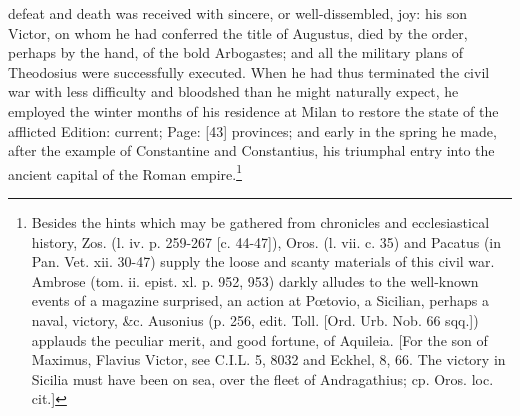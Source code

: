 defeat and death was received with sincere, or well-dissembled, joy: his son Victor, on whom he had conferred the title of Augustus, died by the order, perhaps by the hand, of the bold Arbogastes; and all the military plans of Theodosius were successfully executed. When he had thus terminated the civil war with less difficulty and bloodshed than he might naturally expect, he employed the winter months of his residence at Milan to restore the state of the afflicted Edition: current; Page: [43] provinces; and early in the spring he made, after the example of Constantine and Constantius, his triumphal entry into the ancient capital of the Roman empire.\footnote{Besides the hints which may be gathered from chronicles and ecclesiastical history, Zos. (l. iv. p. 259-267 [c. 44-47]), Oros. (l. vii. c. 35) and Pacatus (in Pan. Vet. xii. 30-47) supply the loose and scanty materials of this civil war. Ambrose (tom. ii. epist. xl. p. 952, 953) darkly alludes to the well-known events of a magazine surprised, an action at Pœtovio, a Sicilian, perhaps a naval, victory, \&c. Ausonius (p. 256, edit. Toll. [Ord. Urb. Nob. 66 sqq.]) applauds the peculiar merit, and good fortune, of Aquileia. [For the son of Maximus, Flavius Victor, see C.I.L. 5, 8032 and Eckhel, 8, 66. The victory in Sicilia must have been on sea, over the fleet of Andragathius; cp. Oros. loc. cit.]}

